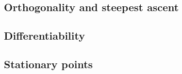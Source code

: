 
\subsection{Orthogonality and steepest ascent} 


\subsection{Differentiability} 


\subsection{Stationary points} 

